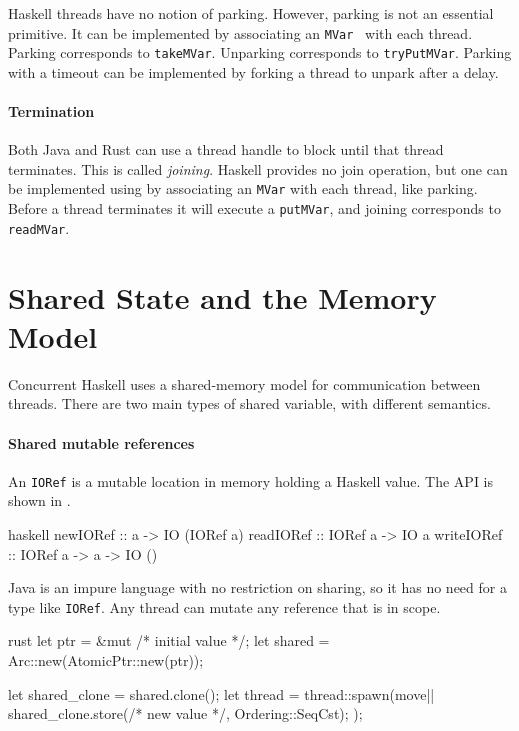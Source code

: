 Haskell threads have no notion of parking.  However, parking is not an
essential primitive.  It can be implemented by associating an
\verb|MVar|~ with each thread.
Parking corresponds to \verb|takeMVar|.  Unparking corresponds to
\verb|tryPutMVar|.  Parking with a timeout can be implemented by
forking a thread to unpark after a delay.

\paragraph{Termination}
Both Java and Rust can use a thread handle to block until that thread
terminates.  This is called \emph{joining}.  Haskell provides no join
operation, but one can be implemented using by associating an
\verb|MVar| with each thread, like parking.  Before a thread
terminates it will execute a \verb|putMVar|, and joining corresponds
to \verb|readMVar|.

\section{Shared State and the Memory Model}
\label{sec:concurrent_haskell-mmodel}

Concurrent Haskell uses a shared-memory model for communication
between threads.  There are two main types of shared variable, with
different semantics.

\paragraph{Shared mutable references}
An \verb|IORef| is a mutable location in memory holding a Haskell
value.  The API is shown in .

\begin{listing}
\centering
\begin{cminted}{haskell}
newIORef   :: a -> IO (IORef a)
readIORef  :: IORef a -> IO a
writeIORef :: IORef a -> a -> IO ()
\end{cminted}
\caption{Shared mutable references in Haskell.}\label{lst:smref_haskell}
\end{listing}

Java is an impure language with no restriction on sharing, so it has
no need for a type like \verb|IORef|.  Any thread can mutate any
reference that is in scope.

\begin{listing}
\centering
\begin{cminted}{rust}
let ptr = &mut /* initial value */;
let shared = Arc::new(AtomicPtr::new(ptr));

let shared_clone = shared.clone();
let thread = thread::spawn(move|| {
    shared_clone.store(/* new value */, Ordering::SeqCst);
});
\end{cminted}
\caption{Shared mutable references in Rust.}\label{lst:smref_rust}
\end{listing}

